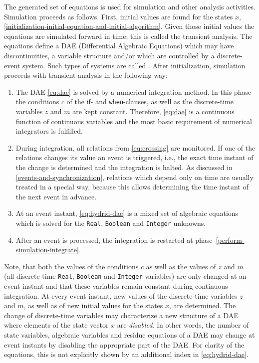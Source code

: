 The generated set of equations is used for simulation and other analysis activities.
Simulation proceeds as follows.
First, initial values are found for the states $x$, \cref{initialization-initial-equation-and-initial-algorithm}.
Given those initial values the equations are simulated forward in time; this is called the transient analysis.
The equations define a DAE (Differential Algebraic Equations) which may have discontinuities, a variable structure and/or which are controlled by a discrete-event system.
Such types of systems are called .
After initialization, simulation proceeds with transient analysis in the following way:
\begin{enumerate}
\item\label{perform-simulation-integrate}
  The DAE \eqref{eq:dae} is solved by a numerical integration method.
  In this phase the conditions $c$ of the if- and \lstinline!when!-clauses, as well as the discrete-time variables $z$ and $m$ are kept constant.
  Therefore, \eqref{eq:dae} is a continuous function of continuous variables and the most basic requirement of numerical integrators is fulfilled.
\item
  During integration, all relations from \eqref{eq:crossing} are monitored.
  If one of the relations changes its value an event is triggered, i.e., the exact time instant of the change is determined and the integration is halted.
  As discussed in \cref{events-and-synchronization}, relations which depend only on time are usually treated in a special way, because this allows determining the time instant of the next event in advance.
\item
  At an event instant, \eqref{eq:hydrid-dae} is a mixed set of algebraic equations which is solved for the \lstinline!Real!, \lstinline!Boolean! and \lstinline!Integer! unknowns.
\item
  After an event is processed, the integration is restarted at phase~\ref{perform-simulation-integrate}.
\end{enumerate}

Note, that both the values of the conditions $c$ as well as the values of $z$ and $m$ (all discrete-time \lstinline!Real!, \lstinline!Boolean! and \lstinline!Integer! variables) are only changed at an event instant and that these variables remain constant during continuous integration.
At every event instant, new values of the discrete-time variables $z$ and $m$, as well as of new initial values for the states $x$, are determined.
The change of discrete-time variables may characterize a new structure of a DAE where elements of the state vector $x$ are \emph{disabled}.
In other words, the number of state variables, algebraic variables and residue equations of a DAE may change at event instants by disabling the appropriate part of the DAE.
For clarity of the equations, this is not explicitly shown by an additional index in \eqref{eq:hydrid-dae}.

